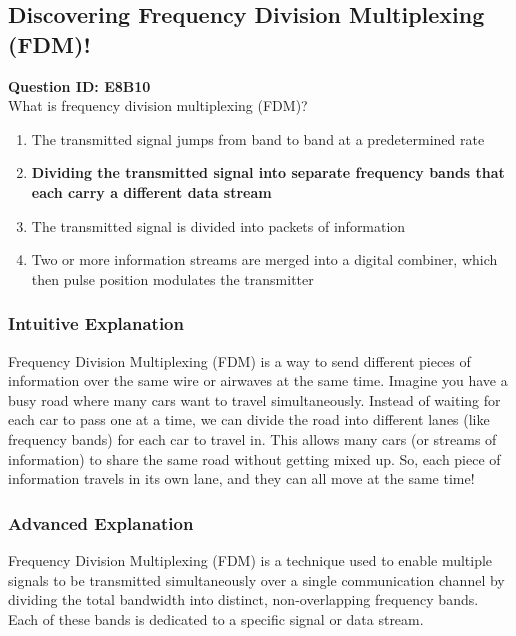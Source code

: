 \subsection{Discovering Frequency Division Multiplexing (FDM)!}

\begin{tcolorbox}
    \textbf{Question ID: E8B10} \\[1em]
    What is frequency division multiplexing (FDM)? 
    \begin{enumerate}[label=\Alph*.]
        \item The transmitted signal jumps from band to band at a predetermined rate
        \item \textbf{Dividing the transmitted signal into separate frequency bands that each carry a different data stream}
        \item The transmitted signal is divided into packets of information
        \item Two or more information streams are merged into a digital combiner, which then pulse position modulates the transmitter
    \end{enumerate}
\end{tcolorbox}

\subsubsection{Intuitive Explanation}
Frequency Division Multiplexing (FDM) is a way to send different pieces of information over the same wire or airwaves at the same time. Imagine you have a busy road where many cars want to travel simultaneously. Instead of waiting for each car to pass one at a time, we can divide the road into different lanes (like frequency bands) for each car to travel in. This allows many cars (or streams of information) to share the same road without getting mixed up. So, each piece of information travels in its own lane, and they can all move at the same time!

\subsubsection{Advanced Explanation}
Frequency Division Multiplexing (FDM) is a technique used to enable multiple signals to be transmitted simultaneously over a single communication channel by dividing the total bandwidth into distinct, non-overlapping frequency bands. Each of these bands is dedicated to a specific signal or data stream.

